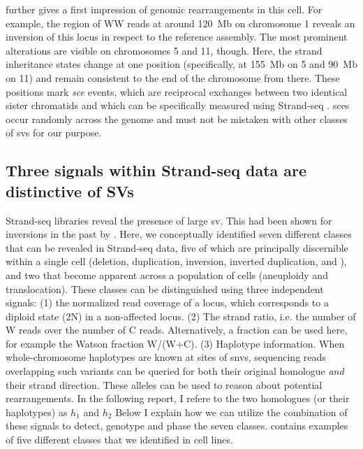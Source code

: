  further gives a first impression of genomic rearrangements
in this cell. For example, the region of WW reads at around 120~Mb on chromosome
1 reveals an inversion of this locus in respect to the reference assembly. The
most prominent alterations are visible on chromosomes 5 and 11, though. Here,
the strand inheritance states change at one position (specifically,
at 155~Mb on 5 and 90~Mb on 11) and remain consistent to
the end of the chromosome from there. These positions mark \emph{\acf{sce}} events,
which are reciprocal exchanges between two identical sister chromatids and
which can be specifically measured using Strand-seq \citep{Falconer2012}.
\Acp{sce} occur randomly across the genome and must not be mistaken with other
classes of \acp{sv} for our purpose.





\subsection{Three signals within Strand-seq data are distinctive of SVs}
\label{sec:mosaic_concept}

Strand-seq libraries reveal the presence of large \Acl{sv}. This had been shown
for inversions in the past by \cite{Sanders2016}. Here, we conceptually identified seven
different \sv classes that can be revealed in Strand-seq data, five of which are
principally discernible within a single cell (deletion, duplication, inversion,
inverted duplication, and \loh), and two that become apparent across a population
of cells (aneuploidy and translocation). These \sv classes can be distinguished
using three independent signals: (1) the normalized read coverage of a locus,
which corresponds to a diploid state (2N) in a non-affected locus.
(2) The strand ratio, i.e. the number of W reads over the number of C reads.
Alternatively, a fraction can be used here, for example the Watson fraction
W/(W+C). (3) Haplotype information. When whole-chromosome haplotypes are known
at sites of \acp{snv}, sequencing reads overlapping such variants can be queried for
both their original homologue \emph{and} their strand direction.
These alleles can be used to reason about potential rearrangements. In the
following report, I refere to the two homologues (or their haplotypes) as $h_1$
and $h_2$
Below I explain how we can utilize the combination of these signals to detect,
genotype and phase the seven \sv classes.  contains examples of
five different \sv classes that we identified in \rpe cell lines.


